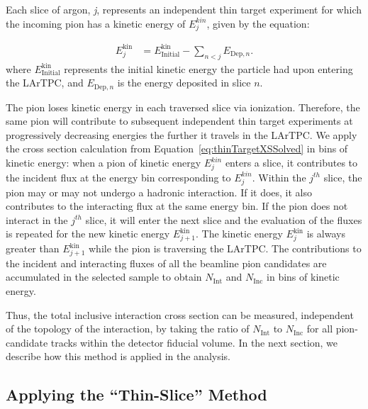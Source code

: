 \documentclass[%
 floatfix,
 reprint,
 twocolumn,
superscriptaddress,
showpacs,preprintnumbers,
 amsmath,amssymb,
 aps,
prd,
]{revtex4-1}
\begin{document}
Each slice of argon, {\emph{j}}, represents an independent thin target experiment for which the incoming pion has a kinetic energy of $E^{kin}_j$, given by the equation:

\begin{equation}
\begin{split}
 E_{j}^\text{kin}  & = E^\text{kin}_{\text{Initial}} -  \sum_{n < j} E_{\text{Dep},n}.
\end{split}
\label{eq:KEj}
\end{equation}
where $E^\text{kin}_{\text{Initial}}$ represents the initial kinetic energy the particle had upon entering the LArTPC, and $E_{\text{Dep},n}$ is the energy deposited in slice $n$. 

The pion loses kinetic energy in each traversed slice via ionization. Therefore, the same pion will contribute to subsequent independent thin target experiments at progressively decreasing energies the further it travels in the LArTPC.  We apply the cross section calculation from Equation~\ref{eq:thinTargetXSSolved} in bins of kinetic energy: when a pion of kinetic energy $E^{kin}_j$ enters a slice, it contributes to the incident flux at the energy bin corresponding to $E^{kin}_j$.  Within the $j^{th}$ slice, the pion may or may not undergo a hadronic interaction. If it does, it also contributes to the interacting flux at the same energy bin. If the pion does not interact in the $j^{th}$ slice, it will enter the next slice and the evaluation of the fluxes is repeated for the new kinetic energy $E^\text{kin}_{j+1}$. The kinetic energy $E^\text{kin}_j$ is always greater than $E^\text{kin}_{j+1}$ while the pion is traversing the LArTPC. The contributions to the incident and interacting fluxes of all the beamline pion candidates are accumulated in the selected sample to obtain $N_{\text{Int}}$ and  $N_{\text{Inc}}$ in bins of kinetic energy.

Thus, the total inclusive interaction cross section can be measured, independent of the topology of the interaction, by taking the ratio of $N_{\text{Int}}$ to  $N_{\text{Inc}}$ for all pion-candidate tracks within the detector fiducial volume. In the next section, we describe how this method is applied in the analysis.

\subsection{Applying the ``Thin-Slice'' Method}
\end{document}
